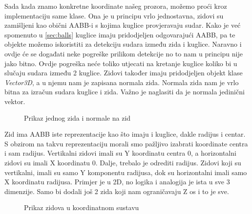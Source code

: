 Sada kada znamo konkretne koordinate našeg prozora, možemo proći kroz implementaciju same klase. Ona je u principu vrlo jednostavna, zidovi su zamišljeni kao obični AABB-i s kojima kuglice provjeravaju sudar. Kako je već spomenuto u \ref{sec:balls} kuglice imaju pridodjeljen odgovarajući AABB, pa te objekte možemo iskoristiti za detekciju sudara između zida i kuglice. Naravno i ovdje će se događati neke pogreške prilikom detekcije no to nam u principu nije jako bitno. Ovdje pogreška neće toliko utjecati na kretanje kuglice koliko bi u slučaju sudara između 2 kuglice. Zidovi također imaju pridodjeljen objekt klase \emph{Vector3D}, a u njemu nam je zapisana normala zida. Normala zida nam je vrlo bitna za izračun sudara kuglice i zida. Važno je naglasiti da je normala jedinični vektor.

\begin{figure}[!http]
	\begin{center}
	\end{center}
	\caption {Prikaz jednog zida i normale na zid}
	\label{fig:19}
\end{figure}
Zid ima AABB iste reprezentacije kao što imaju i kuglice, dakle radijus i centar. S obzirom na takvu reprezentaciju morali smo pažljivo izabrati koordinate centra i sam radijus. Vertikalni zidovi imali su Y koordinatu centra 0, a horizontalni zidovi su imali X koordinatu 0. Dalje, trebalo je odrediti radijus. Zidovi koji su vertikalni, imali su samo Y komponentu radijusa, dok su horizontalni imali samo X koordinatu radijusa. Primjer je u 2D, no logika i analogija je ista u sve 3 dimenzije. Samo bi dodali još 2 zida koji nam ograničavaju Z os i to je sve.
\begin{figure}[!http]
	\begin{center}
	\end{center}
	\caption {Prikaz zidova u koordinatnom sustavu}
	\label{fig:20}
\end{figure}

